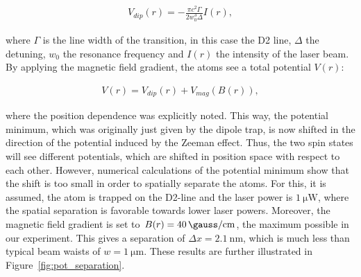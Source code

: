 \begin{align}
	V_{dip}(r) = -\frac{\pi c^2 \Gamma}{2 w_0^3 \Delta} I(r),
\end{align}

where $\Gamma$ is the line width of the transition, in this case the D2 line, $\Delta$ the detuning, $w_0$ the resonance frequency and $I(r)$ the intensity of the laser beam. By applying the magnetic field gradient, the atoms see a total potential $V(r)$:

\begin{align}
	V(r) = V_{dip}(r) + V_{mag}(B(r)),
\end{align}

where the position dependence was explicitly noted. This way, the potential minimum, which was originally just given by the dipole trap, is now shifted in the direction of the potential induced by the Zeeman effect. Thus, the two spin states will see different potentials, which are shifted in position space with respect to each other. However, numerical calculations of the potential minimum show that the shift is too small in order to spatially separate the atoms. For this, it is assumed, the atom is trapped on the D2-line and the laser power is $\SI{1}{\micro\watt}$, where the spatial separation is favorable towards lower laser powers. Moreover, the magnetic field gradient is set to $B(r) = \SI{40}{\gauss\per\centi\meter}$, the maximum possible in our experiment. This gives a separation of $\Delta x = \SI{2.1}{\nano\meter}$, which is much less than typical beam waists of $w = \SI{1}{\micro\meter}$.
These results are further illustrated in Figure~\ref{fig:pot_separation}.

\begin{figure}[tbp]%
\end{figure}


